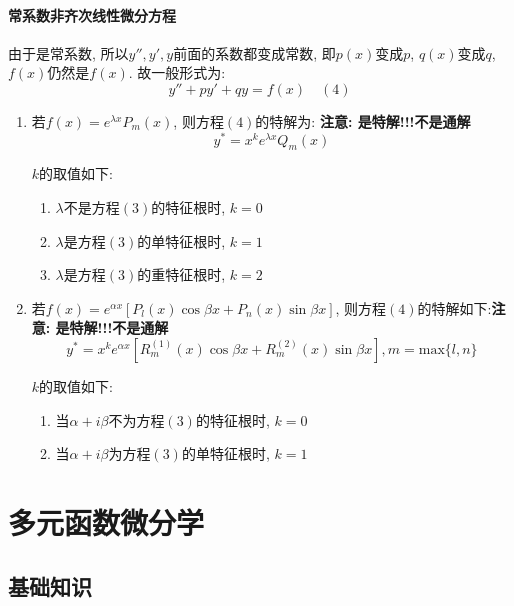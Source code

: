\subsubsection{常系数非齐次线性微分方程}
由于是常系数, 所以$ y'',y',y $前面的系数都变成常数, 即$ p(x) $变成$ p $, $ q(x) $变成$ q $, $ f(x) $仍然是$ f(x) $. 故一般形式为:
\begin{equation*}
    y''+py'+qy=f(x) \quad (4)
\end{equation*}
\begin{enumerate}
    \item 若$ f(x)=e^{\lambda x}P_{m}(x) $, 则方程$ (4) $的特解为: \textbf{注意: 是特解!!!不是通解}
          \begin{equation*}
              y^{*}=x^{k}e^{\lambda x}Q_{m}(x)
          \end{equation*}\par $ k $的取值如下:
          \begin{enumerate}
              \item $ \lambda $不是方程$ (3) $的特征根时, $ k=0 $
              \item $ \lambda $是方程$ (3) $的单特征根时, $ k=1 $
              \item $ \lambda $是方程$ (3) $的重特征根时, $ k=2 $
          \end{enumerate}
    \item 若$ f(x)=e^{\alpha x}[P_{l}(x)\cos \beta x+P_{n}(x)\sin \beta x] $, 则方程$ (4) $的特解如下:\textbf{注意: 是特解!!!不是通解}
          \begin{equation*}
              y^{*}=x^{k}e^{\alpha x}[R_{m}^{(1)}(x)\cos \beta x+R_{m}^{(2)}(x)\sin \beta x], m=\mathrm{max}\{l,n\}
          \end{equation*}\par $ k $的取值如下:
          \begin{enumerate}
              \item 当$ \alpha+i\beta $不为方程$ (3) $的特征根时, $ k=0 $
              \item 当$ \alpha+i\beta $为方程$ (3) $的单特征根时, $ k=1 $
          \end{enumerate}
\end{enumerate}
\chapter{多元函数微分学}
\section{基础知识}
